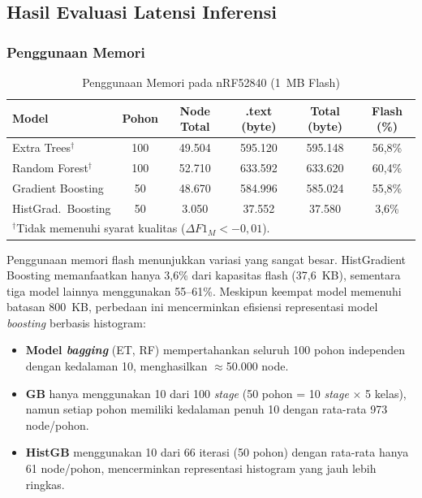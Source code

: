 \subsection{Hasil Evaluasi Latensi Inferensi}

\subsubsection{Penggunaan Memori}

\begin{table}[htbp]
\centering
\caption{Penggunaan Memori pada nRF52840 (1~MB Flash)}
\label{tab:arm_memory}
\begin{tabular}{lccccc}
\hline
\textbf{Model} & \textbf{Pohon} & \textbf{Node Total} & \textbf{.text (byte)} & \textbf{Total (byte)} & \textbf{Flash (\%)} \\
\hline
Extra Trees$^{\dagger}$ & 100 & 49.504  & 595.120 & 595.148 & 56,8\% \\
Random Forest$^{\dagger}$ & 100 & 52.710 & 633.592 & 633.620 & 60,4\% \\
Gradient Boosting & 50 & 48.670 & 584.996 & 585.024 & 55,8\% \\
HistGrad.\ Boosting & 50 & 3.050   & 37.552  & 37.580  & 3,6\% \\
\hline
\multicolumn{6}{l}{\footnotesize $^{\dagger}$Tidak memenuhi syarat kualitas ($\Delta F1_M < -0{,}01$).}
\end{tabular}
\end{table}

Penggunaan memori flash menunjukkan variasi yang sangat besar. HistGradient Boosting memanfaatkan hanya 3,6\% dari kapasitas flash (37,6~KB), sementara tiga model lainnya menggunakan 55--61\%. Meskipun keempat model memenuhi batasan 800~KB, perbedaan ini mencerminkan efisiensi representasi model \textit{boosting} berbasis histogram:

\begin{itemize}
    \item \textbf{Model \textit{bagging}} (ET, RF) mempertahankan seluruh 100 pohon independen dengan kedalaman 10, menghasilkan $\approx$50.000 node.
    \item \textbf{GB} hanya menggunakan 10 dari 100 \textit{stage} (50 pohon = 10 \textit{stage} $\times$ 5 kelas), namun setiap pohon memiliki kedalaman penuh 10 dengan rata-rata 973 node/pohon.
    \item \textbf{HistGB} menggunakan 10 dari 66 iterasi (50 pohon) dengan rata-rata hanya 61 node/pohon, mencerminkan representasi histogram yang jauh lebih ringkas.
\end{itemize}

